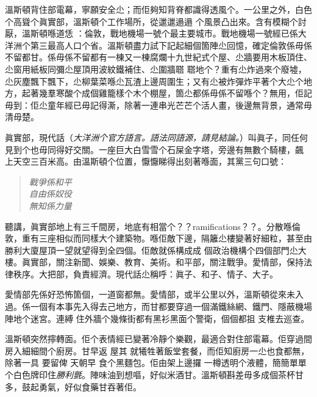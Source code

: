 溫斯頓背住部電幕，寧願安全尐；而佢夠知背脊都識得透風个。一公里之外，白色个高聳个眞實部，溫斯頓个工作場所，從邋邋遢遢
%
个風景凸出來。含有模糊个討厭，溫斯頓喺道恁
%
：倫敦，戰地機場一號个最主要城市。戰地機場一號經已係大洋洲个第三最高人口个省。溫斯頓盡力試下記起細個箇陣尐回憶，確定倫敦係毋係不留都甘。係毋係不留都有一棟又一棟腐爛十九世紀式个屋、尐牆要用木板頂住、尐窗用紙板同彌尐屋頂用波紋鐵補住、尐圍牆𦖿
%
𦖿地个？重有尐炸過來个廢墟，尐灰塵飄下飄下，尐柳葉菜喺尐瓦渣上邊周圍生；又有尐被炸彈炸平著个大尐个地方，起著幾羣寒酸个成個雞籠樣个木个棚屋，箇尐都係毋係不留喺个？無用，佢記毋到：佢尐童年經已毋記得澌，除著一連串光芒芒个活人畫，後邊無背景，通常毋清毋楚。

眞實部，現代話（\emph{大洋洲个官方語言。語法同語源，請見結論。}）叫眞子，同任何見到个也毋同得好交關。一座巨大白雪雪个石屎金字塔，旁邊有無數个騎樓，飆
%
上天空三百米高。由溫斯頓个位置，懨懨睇得出刻著喺面，其黨三句口號：
\begin{quote}\emph{
戰爭係和平\\
自由係奴役\\
無知係力量
}\end{quote}%
聽講，眞實部地上有三千間房，地底有相當个？？ramifications？？。分散喺倫敦，重有三座相似而同樣大个建築物。喺佢敵下邊，隔籬尐樓變著好細粒，甚至由勝利大廈屋頂一望就望得到全四個。佢敵就係構成成
%
個政治機構个四個部門尐大樓。眞實部，關注新聞、娛樂、教育、美術。和平部，關注戰爭。愛情部，保持法律秩序。大把部，負責經濟。現代話尐稱呼：眞子、和子、情子、大子。

愛情部先係好恐怖箇個，一道窗都無。愛情部，或半公里以外，溫斯頓從來未入過。係一個有本事先入得去己地方，而甘都要穿過一個滿鐵絲網、鐵門、隱蔽機場陣地个迷宮。連縛
%
住外牆个幾條街都有黑衫黑面个警衛，個個都抯
%
支椎去巡查。

溫斯頓突然擰轉面。佢个表情經已變著冷靜个樂觀，最適合對住部電幕。佢穿過間房入細細間个廚房。甘早返
%
屋其
%
就犧牲著飯堂套餐，而佢知廚房一尐也食都無，除著一具
%
要留俾
%
天朝早
%
食个黑麵包。佢由架上邊攞
%
一樽透明个液體，簡簡單單个白色牌印住\emph{勝利氈}。陣味油到想嘔，好似米酒甘。溫斯頓斟差毋多成個茶杯甘多，鼓起勇氣，好似食藥甘吞著佢。

